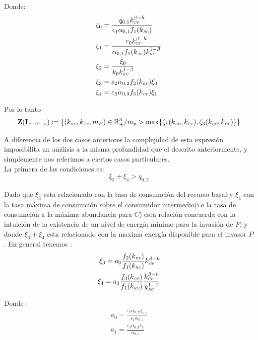 Donde:
\begin{equation}
  \begin{aligned}
    \xi_0 &= \frac{q_{0,1} k_{\textit{\tiny CP}}^{\beta - h}}{\epsilon_1 \alpha_{0,1} f_1(k_{\textit{\tiny RC}})}\\
    \xi_1 &= \frac{r_0 k_{\textit{\tiny CP}}^{\beta-h}}{\alpha_{0,1} f_1(k_{\textit{\tiny RC}})k_{\textit{\tiny RC}}^{1-\beta}}\\
    \xi_2 &= \frac{\xi_0}{k_0 k_{\textit{\tiny RP}}^{1-\beta}} \\
    \xi_3 &= \varepsilon_2 \alpha_{0,2} f_2(k_{\textit{\tiny RP}}) \xi_0\\
    \xi_4 &=\varepsilon_3 \alpha_{0,3} f_3(k_{\textit{\tiny CP}}) \xi_1
  \end{aligned}
\end{equation}

Por lo tanto 
\begin{equation}
\mathbf{Z(I_{\textit{\tiny P} \to \textit{\tiny C}-\textit{\tiny R}})} := \{ (k_{\textit{\tiny RC}},k_{\textit{\tiny CP}},m_P) \in \mathbb{R}^3_+ / m_p > \max\{\zeta_1(k_{\textit{\tiny RC}},k_{\textit{\tiny CP}}),\zeta_3(k_{\textit{\tiny RC}},k_{\textit{\tiny CP}})\} \}
\end{equation}

A diferencia de los dos casos anteriores la complejidad de esta expresi\'on imposibilita un an\'alisis a la misma profundidad que el descrito anteriormente, y simplemente nos referimos a ciertos casos particulares.\\

La primera de las condiciones es:
\begin{equation}
  \xi_3 + \xi_4 > q_{0,2}
\end{equation}

Dado que $\xi_3$ esta relacionado con la tasa de consumci\'on del recurso basal y $\xi_4$ con la tasa m\'axima de consumci\'on sobre el consumidor intermedio(i.e la tasa de consumci\'on a la m\'axima abundancia para $C$) esta relaci\'on concuerda con la intuici\'on de la existencia de un nivel de energ\'ia m\'inimo para la invasi\'on de $P$, y donde $\xi_3 + \xi_4$ esta relacionado con la maxima energ\'ia disponible para el invasor $P$.
En general tenemos :
\begin{equation}
  \begin{aligned}
    \xi_3 = a_0 \frac{f_2(k_{\textit{\tiny RP}})}{f_1(k_{\textit{\tiny RC}})} k_{\textit{\tiny CP}}^{\beta-h} \\
    \xi_4 = a_1 \frac{f_3(k_{\textit{\tiny CP}})}{f_1(k_{\textit{\tiny RC}})} \frac{k_{\textit{\tiny CP}}^{\beta - h}}{k_{\textit{\tiny RC}}^{1-\beta}}
  \end{aligned}
\end{equation}

Donde :
\begin{equation}
  \begin{aligned}
    a_0 = \frac{\varepsilon_2 \alpha_{0,2} q_{0,1}}{\varepsilon_1 \alpha_{0,1}} \\
    a_1 = \frac{\varepsilon_3 \alpha_{0,3} r_0}{\alpha_{0,1}}
  \end{aligned}
\end{equation}

